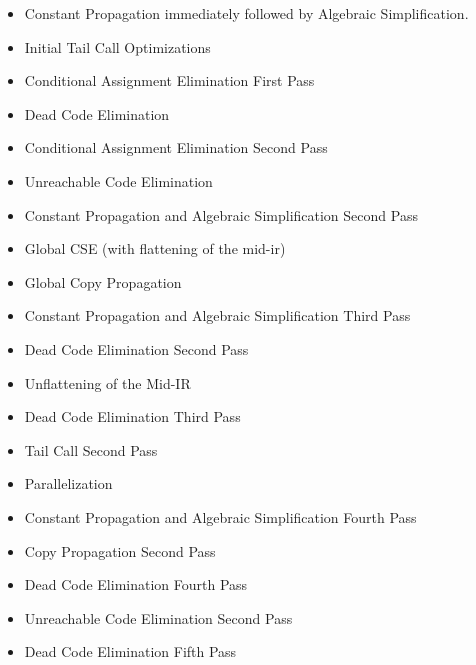 \documentclass[11pt]{article}
\begin{document}
\begin{itemize}

\item Constant Propagation immediately followed by Algebraic
  Simplification. 

\item Initial Tail Call Optimizations 

\item Conditional Assignment Elimination First Pass

\item Dead Code Elimination

\item Conditional Assignment Elimination Second Pass

\item Unreachable Code Elimination

\item Constant Propagation and Algebraic Simplification Second Pass

\item Global CSE (with flattening of the mid-ir)

\item Global Copy Propagation

\item Constant Propagation and Algebraic Simplification Third Pass

\item Dead Code Elimination Second Pass

\item Unflattening of the Mid-IR

\item Dead Code Elimination Third Pass

\item Tail Call Second Pass

\item Parallelization 

\item Constant Propagation and Algebraic Simplification Fourth Pass

\item Copy Propagation Second Pass

\item Dead Code Elimination Fourth Pass

\item Unreachable Code Elimination Second Pass

\item Dead Code Elimination Fifth Pass

\end{itemize}
\end{document}
